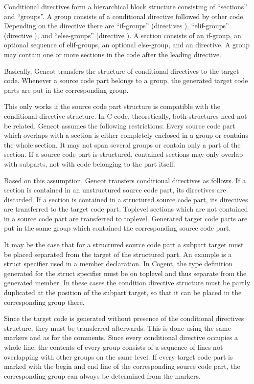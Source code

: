Conditional directives form a hierarchical block structure consisting of ``sections'' and ``groups''. A group
consists of a conditional directive followed by other code. Depending on the directive there are ``if-groups''
(directives ), ``elif-groups'' (directive ), and ``else-groups''
(directive ). A section consists of an if-group, an optional sequence of elif-groups, an optional
else-group, and an  directive. A group may contain one or more sections in the code after the
leading directive.

Basically, Gencot transfers the structure of conditional directives to the target code. Whenever a source code
part belongs to a group, the generated target code parts are put in the corresponding group. 

This only works if the source code part structure is compatible with the conditional directive structure.
In C code, theoretically, both structures need not be related. Gencot assumes the following restrictions:
Every source code part which overlaps with a section is either completely enclosed in a group or
contains the whole section. It may not span several groups or contain only a part of the section. If a
source code part is structured, contained sections may only overlap with subparts, not with code belonging
to the part itself. 

Based on this assumption, Gencot transfers conditional directives as follows. If a section is contained in an 
unstructured source code part, its directives are discarded. If a section is contained in a structured source
code part, its directives are transferred to the target code part. Toplevel sections which are not contained in
a source code part are transferred to toplevel. Generated target code parts are put in the same group which
contained the corresponding source code part.

It may be the case that for a structured source code part a subpart target must be placed separated from the
target of the structured part. An example is a struct specifier used in a member declaration. In Cogent, the 
type definition generated for the struct specifier must be on toplevel and thus separate from the generated member.
In these cases the condition directive structure must be partly duplicated at the position of the subpart target,
so that it can be placed in the corresponding group there.

Since the target code is generated without presence of the conditional directives structure, they must be 
transferred afterwards. This is done using the same markers  and  as for the
comments. Since every conditional directive occupies a whole line, the contents of every group consists of
a sequence of lines not overlapping with other groups on the same level. If every target code part is marked 
with the begin and end line of the corresponding source code part, the corresponding group can always be
determined from the markers.

